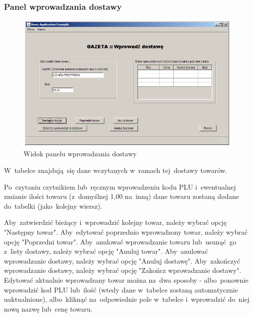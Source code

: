 \subsubsection{Panel wprowadzania dostawy}
\begin{figure}[h]
\begin{center}
\includegraphics[width=20cm,angle=90,keepaspectratio]{gfx/dostawa.png}
\end{center}
\caption{Widok panelu wprowadzania dostawy}
\end{figure}
W~tabelce znajdują~się dane wczytanych w~ramach tej~dostawy towarów.

Po~czytaniu czytnikiem lub~ręcznym wprowadzeniu kodu PLU i~ewentualnej zmianie ilości towaru (z~domyślnej 1,00 na~inną) dane towaru zostaną dodane do~tabelki (jako~kolejny wiersz).

Aby~zatwierdzić bieżący i~wprowadzić kolejny towar, należy wybrać opcję "Następny towar". Aby~edytować poprzednio wprowadzony towar, należy wybrać opcję "Poprzedni towar". Aby~anulować wprowadzanie towaru lub~usunąć~go z~listy dostawy, należy wybrać opcję "Anuluj towar". Aby~anulować wprowadzanie dostawy, należy wybrać opcję "Anuluj dostawę". Aby~zakończyć wprowadzanie dostawy, należy wybrać opcję "Zakończ wprowadzanie dostawy".
Edytować aktualnie wprowadzany towar można na~dwa sposoby - albo~ponownie wprowadzić kod PLU lub~ilość (wtedy dane w~tabelce zostaną automatycznie uaktualnione), albo~kliknąć na~odpowiednie pole w~tabelce i~wprowadzić do~niej nową nazwę lub~cenę towaru.
\clearpage

